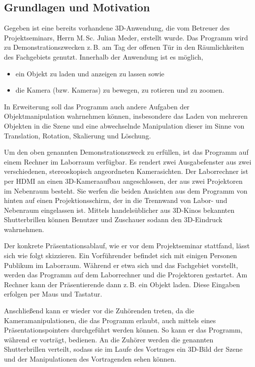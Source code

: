 \subsection{Grundlagen und Motivation}\label{sec:grundl}
Gegeben ist eine bereits vorhandene 3D-Anwendung, die vom Betreuer des Projektseminars, Herrn M.\,Sc. Julian Meder, erstellt wurde. Das Programm wird zu Demonstrationszwecken z.\,B. am Tag der offenen Tür in den Räumlichkeiten des Fachgebiets genutzt. Innerhalb der Anwendung ist es möglich,
\begin{itemize}
\item ein Objekt zu laden und anzeigen zu lassen sowie 
\item die Kamera (bzw. Kameras) zu bewegen, zu rotieren und zu zoomen.
\end{itemize}
In Erweiterung soll das Programm auch andere Aufgaben der Objektmanipulation wahrnehmen können, insbesondere das Laden von mehreren Objekten in die Szene und eine abwechselnde Manipulation dieser im Sinne von Translation, Rotation, Skalierung und Löschung.\par
Um den oben genannten Demonstrationszweck zu erfüllen, ist das Programm auf einem Rechner im Laborraum verfügbar. Es rendert zwei Ausgabefenster aus zwei verschiedenen, stereoskopisch angeordneten Kamerasichten. Der Laborrechner ist per HDMI an einen 3D-Kameraaufbau angeschlossen, der aus zwei Projektoren im Nebenraum besteht. Sie werfen die beiden Ansichten aus dem Programm von hinten auf einen Projektionsschirm, der in die Trennwand von Labor- und Nebenraum eingelassen ist. Mittels handelsüblicher aus 3D-Kinos bekannten Shutterbrillen können Benutzer und Zuschauer sodann den 3D-Eindruck wahrnehmen.\par
Der konkrete Präsentationsablauf, wie er vor dem Projektseminar stattfand, lässt sich wie folgt skizzieren. Ein Vorführender befindet sich mit einigen Personen Publikum im Laborraum. Während er etwa sich und das Fachgebiet vorstellt, werden das Programm auf dem Laborrechner und die Projektoren gestartet. Am Rechner kann der Präsentierende dann z.\,B. ein Objekt laden. Diese Eingaben erfolgen per Maus und Tastatur.\par Anschließend kann er wieder vor die Zuhörenden treten, da die Kameramanipulationen, die das Programm erlaubt, auch mittels eines Präsentationspointers durchgeführt werden können. So kann er das Programm, während er vorträgt, bedienen. An die Zuhörer werden die genannten Shutterbrillen verteilt, sodass sie im Laufe des Vortrages ein 3D-Bild der Szene und der Manipulationen des Vortragenden sehen können.\par

